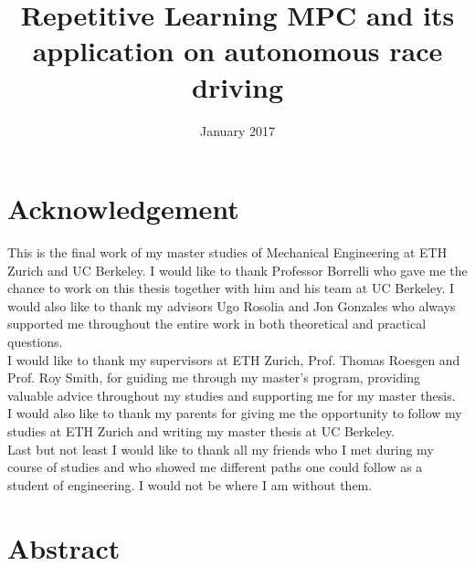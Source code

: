 \documentclass[10pt,twoside,a4paper,fleqn]{report}
\title{Repetitive Learning MPC and its application on autonomous race driving}
\date{January 2017}
\theoremstyle{definition}
\begin{document}
\maketitle 							%

\setcounter{tocdepth}{2}
\tableofcontents
 \cleardoublepage

\chapter*{Acknowledgement}
This is the final work of my master studies of Mechanical Engineering at ETH Zurich and UC Berkeley. I would like to thank Professor Borrelli who gave me the chance to work on this thesis together with him and his team at UC Berkeley. I would also like to thank my advisors Ugo Rosolia and Jon Gonzales who always supported me throughout the entire work in both theoretical and practical questions.\\
I would like to thank my supervisors at ETH Zurich, Prof. Thomas Roesgen and Prof. Roy Smith, for guiding me through my master's program, providing valuable advice throughout my studies and supporting me for my master thesis.\\
I would also like to thank my parents for giving me the opportunity to follow my studies at ETH Zurich and writing my master thesis at UC Berkeley.\\
Last but not least I would like to thank all my friends who I met during my course of studies and who showed me different paths one could follow as a student of engineering. I would not be where I am without them.
 \cleardoublepage
 
\chapter*{Abstract}
\end{document}
